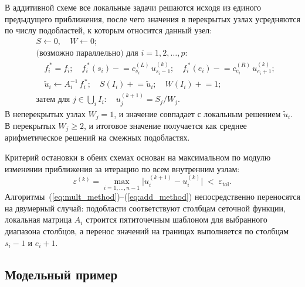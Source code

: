 В аддитивной схеме все локальные задачи решаются исходя из единого
предыдущего приближения, после чего значения в перекрытых узлах усредняются по
числу подобластей, к которым относится данный узел:
\begin{equation}\label{eq:add_method}
\begin{aligned}
    &S \leftarrow 0,\quad W \leftarrow 0;\\
    &\text{(возможно параллельно) для } i = 1,2,\dots,p:\\
    &\quad
    f_i^{\,*} = f_i;\quad
    f_i^{\,*}(s_i) \mathrel{-}= c^{(L)}_{s_i}\,u^{(k)}_{s_i - 1};\quad
    f_i^{\,*}(e_i) \mathrel{-}= c^{(R)}_{e_i}\,u^{(k)}_{e_i + 1};\\
    &\quad
    \tilde{u}_i \leftarrow A_i^{-1}\,f_i^{\,*};\quad
    S(I_i) \mathrel{+}= \tilde{u}_i;\quad W(I_i) \mathrel{+}= 1;\\
    &\text{затем для } j\in\bigcup_i I_i:\quad
    u^{(k+1)}_j = S_j / W_j.
\end{aligned}
\end{equation}
В неперекрытых узлах $W_j=1$, и значение совпадает с локальным решением
$\tilde{u}_i$. В перекрытых $W_j\geqslant 2$, и итоговое значение получается
как среднее арифметическое решений на смежных подобластях.

Критерий остановки в обеих схемах основан на максимальном по модулю
изменении приближения за итерацию по всем внутренним узлам:
\begin{equation}\label{eq:stop_crit}
    \varepsilon^{(k)} = \max_{i=1,\dots,n-1}
    \bigl|u^{(k+1)}_i - u^{(k)}_i\bigr|
    \;<\;\varepsilon_{\text{tol}}.
\end{equation}
Алгоритмы~(\ref{eq:mult_method})--(\ref{eq:add_method}) непосредственно
переносятся на двумерный случай: подобласти соответствуют столбцам сеточной
функции, локальная матрица $A_i$ строится пятиточечным шаблоном для
выбранного диапазона столбцов, а перенос значений на границах выполняется по
столбцам $s_i-1$ и $e_i+1$.

\subsection{Модельный пример}

